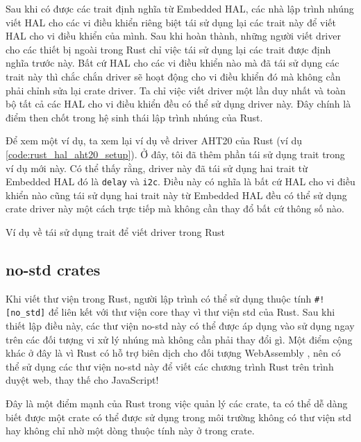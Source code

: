 Sau khi có được các trait định nghĩa từ Embedded HAL, các nhà lập trình nhúng viết HAL cho các vi điều khiển riêng biệt tái sử dụng lại các trait này để viết HAL cho vi điều khiển của mình.
Sau khi hoàn thành, những người viết driver cho các thiết bị ngoài trong Rust chỉ việc tái sử dụng lại các trait được định nghĩa trước này.
Bất cứ HAL cho các vi điều khiển nào mà đã tái sử dụng các trait này thì chắc chắn driver sẽ hoạt động cho vi điều khiển đó mà không cần phải chỉnh sửa lại crate driver.
Ta chỉ việc viết driver một lần duy nhất và toàn bộ tất cả các HAL cho vi điều khiển đều có thể sử dụng driver này.
Đây chính là điểm then chốt trong hệ sinh thái lập trình nhúng của Rust.

Để xem một ví dụ, ta xem lại ví dụ về driver AHT20 của Rust (ví dụ \ref{code:rust_hal_aht20_setup}).
Ở đây, tôi đã thêm phần tái sử dụng trait trong ví dụ mới này.
Có thể thấy rằng, driver này đã tái sử dụng hai trait từ Embedded HAL đó là \texttt{delay} và \texttt{i2c}.
Điều này có nghĩa là bất cứ HAL cho vi điều khiển nào cũng tái sử dụng hai trait này từ Embedded HAL đều có thể sử dụng crate driver này một cách trực tiếp mà không cần thay đổ bất cứ thông số nào.
\begin{listing}[ht]
\begin{rustcode}
use embedded_hal::blocking::{delay::DelayMs, i2c::{Write, WriteRead}};
pub fn new(i2c: I2C, delay: D) -> Result<Self, Error<E>> {
\end{rustcode}
\caption{Ví dụ về tái sử dụng trait để viết driver trong Rust}
\end{listing}

\subsection{no-std crates}
Khi viết thư viện trong Rust, người lập trình có thể sử dụng thuộc tính \texttt{#![no_std]} để liên kết với thư viện core thay vì thư viện std của Rust.
Sau khi thiết lập điều này, các thư viện no-std này có thể được áp dụng vào sử dụng ngay trên các đối tượng vi xử lý nhúng mà không cần phải thay đổi gì.
Một điểm cộng khác ở đây là vì Rust có hỗ trợ biên dịch cho đối tượng WebAssembly \cite{rustc_book}, nên có thể sử dụng các thư viện no-std này để viết các chương trình Rust trên trình duyệt web, thay thế cho JavaScript! \cite{hoffman2019programming, wasm_book}

Đây là một điểm mạnh của Rust trong việc quản lý các crate, ta có thể dễ dàng biết được một crate có thể được sử dụng trong môi trường không có thư viện std hay không chỉ nhờ một dòng thuộc tính này ở trong crate.

